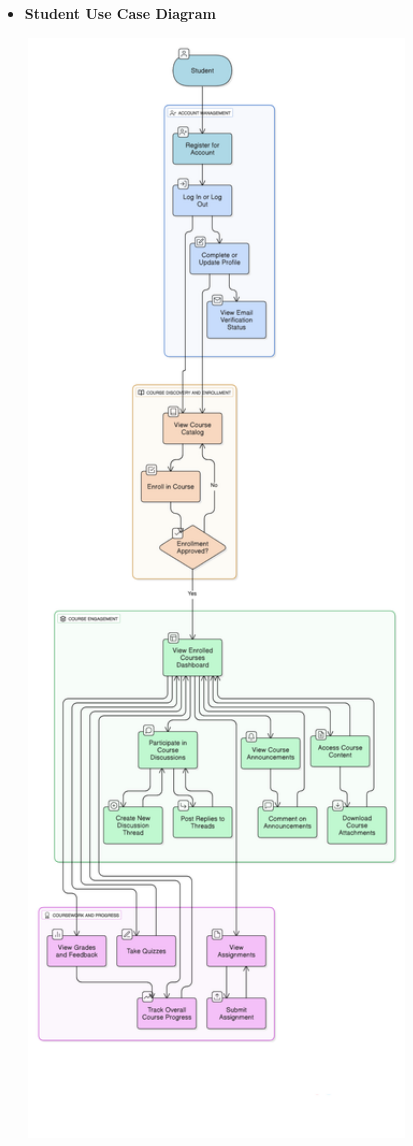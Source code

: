\documentclass[12pt,a4paper]{article}
\begin{document}
\clearpage
\begin{itemize}
    
    \item \textbf{Student Use Case Diagram}
    \begin{center}
        \includegraphics[width=0.8\textwidth,height=0.85\textheight,keepaspectratio]{student-usecase-diagram.png}
        \label{fig:student-usecase}
    \end{center}


\end{itemize}
\end{document}
